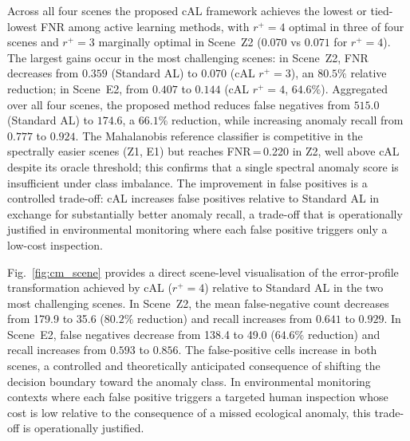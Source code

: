 \documentclass[lettersize,journal]{IEEEtran}
\begin{document}
Across all four scenes the proposed cAL framework achieves the lowest or
tied-lowest FNR among active learning methods, with $r^{+}=4$ optimal in
three of four scenes and $r^{+}=3$ marginally optimal in Scene~Z2 ($0.070$
vs $0.071$ for $r^{+}=4$). The largest gains occur in the most challenging
scenes: in Scene~Z2, FNR decreases from $0.359$ (Standard AL) to $0.070$
(cAL $r^{+}=3$), an $80.5\%$ relative reduction; in Scene~E2, from $0.407$
to $\mathbf{0.144}$ (cAL $r^{+}=4$, $64.6\%$). Aggregated over all four scenes, the proposed method reduces false
negatives from $515.0$ (Standard AL) to $174.6$, a $66.1\%$ reduction, while
increasing anomaly recall from $0.777$ to $0.924$. The Mahalanobis reference
classifier is competitive in the spectrally easier scenes (Z1, E1) but reaches
FNR\,=\,0.220 in Z2, well above cAL despite its oracle threshold; this
confirms that a single spectral anomaly score is insufficient under class
imbalance. The improvement in false positives is a controlled trade-off:
cAL increases false positives relative to Standard AL in exchange for
substantially better anomaly recall, a trade-off that is operationally
justified in environmental monitoring where each false positive triggers
only a low-cost inspection.

Fig.~\ref{fig:cm_scene} provides a direct scene-level visualisation of
the error-profile transformation achieved by cAL ($r^{+}=4$) relative
to Standard AL in the two most challenging scenes. In Scene~Z2, the
mean false-negative count decreases from 179.9 to 35.6 ($80.2\%$ reduction)
and recall increases from $0.641$ to $0.929$. In Scene~E2, false
negatives decrease from 138.4 to 49.0 ($64.6\%$ reduction) and recall
increases from $0.593$ to $0.856$. The false-positive cells increase in
both scenes, a controlled and theoretically anticipated consequence of
shifting the decision boundary toward the anomaly class. In
environmental monitoring contexts where each false positive triggers a
targeted human inspection whose cost is low relative to the consequence
of a missed ecological anomaly, this trade-off is operationally
justified.
\end{document}
